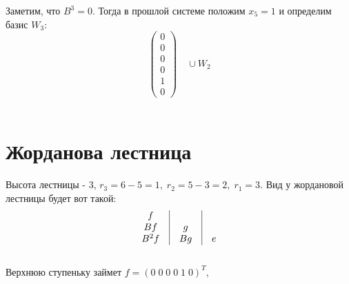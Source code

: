 \noindent Заметим, что $B^3 = 0$. Тогда в прошлой системе положим $x_5 = 1$ и определим базис $W_3$: \\
\[
\begin{pmatrix}
0 \\ 0 \\ 0 \\ 0 \\ 1 \\ 0
\end{pmatrix}
\quad
\cup W_2
\] \\
\section{Жорданова лестница}
Высота лестницы - 3, $r_3 = 6 - 5 = 1, \; r_2 = 5 - 3 = 2, \; r_{1} = 3$. Вид у жордановой лестницы будет вот такой: \\
\[
\begin{array}{ccccc}
 f & \vline &  & \vline &  \\
 Bf & \vline & g & \vline &  \\
 B^2f & \vline & Bg & \vline & e \\
\end{array}
\] \\
\noindent Верхнюю ступеньку займет $f = (0 \; 0 \; 0 \; 0 \; 1 \;0)^T$, \\

